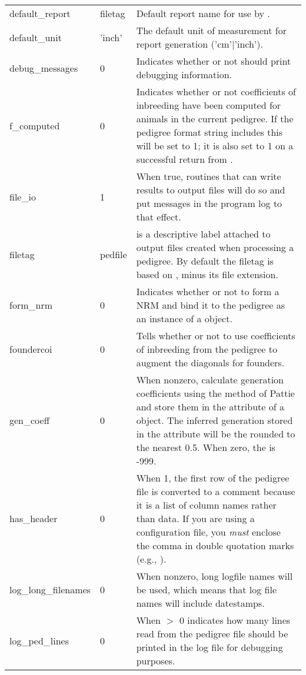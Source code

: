 \begin{center}
\begin{xtabular}{l|l|p{4in}}
	default\_report   & filetag      & Default report name for use by . \\
	default\_unit     & 'inch'       & The default unit of measurement for report generation ('cm'|'inch'). \\
	debug\_messages  & 0            & Indicates whether or not \PyPedal{} should print debugging information. \\
	f\_computed       & 0            & Indicates whether or not coefficients of inbreeding  have been computed for animals in the current pedigree.  If the pedigree format string includes  this will be set to 1; it is also set to 1 on a successful return from . \\
	file\_io         & 1            & When true, routines that can write results to output files will do so and put messages in the program log to that effect. \\
	filetag          & pedfile      &  is a descriptive label attached to output files created when processing a pedigree.  By default the filetag is based on , minus its file extension. \\
	form\_nrm        & 0            & Indicates whether or not to form a NRM and bind it to the pedigree as an instance of a  object. \\
	foundercoi	 & 0		& Tells  whether or not to use coefficients of inbreeding from the pedigree to augment the diagonals for founders.\\
	gen\_coeff       & 0            & When nonzero, calculate generation coefficients using the method of Pattie \citeyear{Pattie1965} and store them in the  attribute of a  object.  The inferred generation stored in the  attribute will be the  rounded to the nearest 0.5.  When zero, the  is -999. \\
	has\_header	 & 0		& When 1, the first row of the pedigree file is converted to a comment because it is a list of column names rather than data. If you are using a configuration file, you \emph{must} enclose the comma in double quotation marks (e.g., ). \\
	log\_long\_filenames & 0        & When nonzero, long logfile names will be used, which means that log file names will include datestamps. \\
	log\_ped\_lines  & 0            & When $>$ 0 indicates how many lines read from the pedigree file should be printed in the log file for debugging purposes. \\

\end{xtabular}
\end{center}
